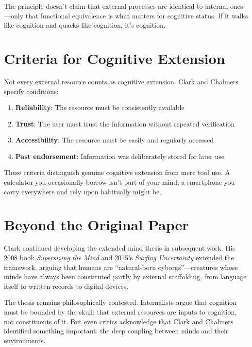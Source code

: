The principle doesn't claim that external processes are identical to internal ones---only that functional equivalence is what matters for cognitive status. If it walks like cognition and quacks like cognition, it's cognition.

\section{Criteria for Cognitive Extension}

Not every external resource counts as cognitive extension. Clark and Chalmers specify conditions:

\begin{enumerate}
    \item \textbf{Reliability}: The resource must be consistently available
    \item \textbf{Trust}: The user must trust the information without repeated verification
    \item \textbf{Accessibility}: The resource must be easily and regularly accessed
    \item \textbf{Past endorsement}: Information was deliberately stored for later use
\end{enumerate}

These criteria distinguish genuine cognitive extension from mere tool use. A calculator you occasionally borrow isn't part of your mind; a smartphone you carry everywhere and rely upon habitually might be.

\section{Beyond the Original Paper}

Clark continued developing the extended mind thesis in subsequent work. His 2008 book \emph{Supersizing the Mind} \cite{clark2008supersizing} and 2015's \emph{Surfing Uncertainty} \cite{clark2015surfing} extended the framework, arguing that humans are ``natural-born cyborgs''---creatures whose minds have always been constituted partly by external scaffolding, from language itself to written records to digital devices.

The thesis remains philosophically contested. Internalists argue that cognition must be bounded by the skull; that external resources are inputs to cognition, not constituents of it. But even critics acknowledge that Clark and Chalmers identified something important: the deep coupling between minds and their environments.

